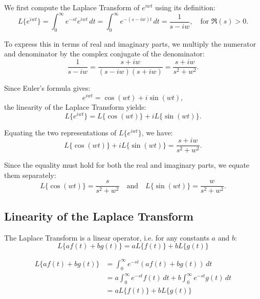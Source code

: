 \documentclass[a4paper, 10pt]{article}
\begin{document}
\begin{examplebox}
  We first compute the Laplace Transform of $e^{iwt}$ using its definition:
  \[
    L\{e^{iwt}\} = \int_0^\infty e^{-st}e^{iwt}\,dt
    = \int_0^\infty e^{-(s-iw)t}\,dt
    = \frac{1}{s-iw}, \quad \text{for } \Re(s) > 0.
  \]

  To express this in terms of real and imaginary parts, we multiply the numerator and denominator by the complex conjugate of the denominator:
  \[
    \frac{1}{s-iw} = \frac{s+iw}{(s-iw)(s+iw)} = \frac{s+iw}{s^2 + w^2}.
  \]

  Since Euler's formula gives:
  \[
    e^{iwt} = \cos(wt) + i\sin(wt),
  \]
  the linearity of the Laplace Transform yields:
  \[
    L\{e^{iwt}\} = L\{\cos(wt)\} + iL\{\sin(wt)\}.
  \]

  Equating the two representations of $L\{e^{iwt}\}$, we have:
  \[
    L\{\cos(wt)\} + iL\{\sin(wt)\} = \frac{s+iw}{s^2+w^2}.
  \]

  Since the equality must hold for both the real and imaginary parts, we equate them separately:
  \[
    L\{\cos(wt)\} = \frac{s}{s^2+w^2} \quad \text{and} \quad L\{\sin(wt)\} = \frac{w}{s^2+w^2}.
  \]
\end{examplebox}

\subsection{Linearity of the Laplace Transform}
The Laplace Transform is a linear operator, i.e. for any constants $a$ and $b$:
$$L\{af(t) + bg(t)\} = aL\{f(t)\} + bL\{g(t)\}$$
\begin{proofbox}
  \begin{align*}
    L\{af(t) + bg(t)\}
     & = \int_0^\infty e^{-st}(af(t) + bg(t))\, dt                         \\
     & = a\int_0^\infty e^{-st}f(t)\, dt + b\int_0^\infty e^{-st}g(t)\, dt \\
     & = aL\{f(t)\} + bL\{g(t)\}
  \end{align*}
\end{proofbox}

\newpage
\end{document}
